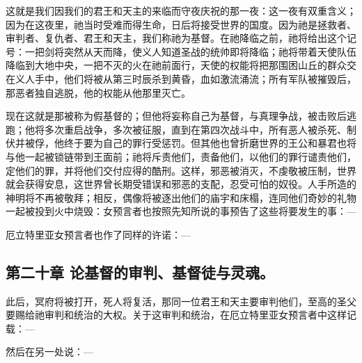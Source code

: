 \par

这就是我们因我们的君王和天主的来临而守夜庆祝的那一夜：这一夜有双重含义；因为在这夜里，祂当时受难而得生命，日后将接受世界的国度。因为祂是拯救者、审判者、复仇者、君王和天主，我们称祂为基督。在祂降临之前，祂将给出这个记号：一把剑将突然从天而降，使义人知道圣战的统帅即将降临；祂将带着天使队伍降临到大地中央，一把不灭的火在祂前面行，天使的权能将把那围困山丘的群众交在义人手中，他们将被从第三时辰杀到黄昏，血如激流涌流；所有军队被摧毁后，那恶者独自逃脱，他的权能从他那里灭亡。\par

现在这就是那被称为假基督的；但他将妄称自己为基督，与真理争战，被击败后逃跑；他将多次重启战争，多次被征服，直到在第四次战斗中，所有恶人被杀死、制伏并被俘，他终于要为自己的罪行受惩罚。但其他也曾折磨世界的王公和暴君也将与他一起被锁链带到王面前；祂将斥责他们，责备他们，以他们的罪行谴责他们，定他们的罪，并将他们交付应得的酷刑。这样，邪恶被消灭，不虔敬被压制，世界就会获得安息，这世界曾长期受错误和邪恶的支配，忍受可怕的奴役。人手所造的神明将不再被敬拜；相反，偶像将被逐出他们的庙宇和床榻，连同他们奇妙的礼物一起被投到火中烧毁：女预言者也按照先知所说的事预告了这些将要发生的事：—\par

\par

厄立特里亚女预言者也作了同样的许诺：—\par

\par


\subsection{第二十章 论基督的审判、基督徒与灵魂。}

此后，冥府将被打开，死人将复活，那同一位君王和天主要审判他们，至高的圣父要赐给祂审判和统治的大权。关于这审判和统治，在厄立特里亚女预言者中这样记载：—\par

\par

然后在另一处说：—\par

